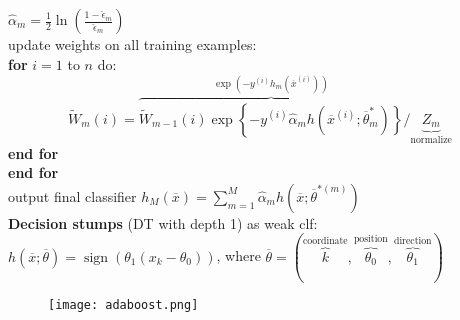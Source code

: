 \documentclass[10pt, letterpaper]{article}
\begin{document}
\begin{multicols*}{2}
\hspace*{4ex}$\boxed{\hat{\alpha}_{m}=\frac{1}{2} \ln \left(\frac{1-\hat{\epsilon}_{m}}{\hat{\epsilon}_{m}}\right)}$\\
\hspace*{2ex}update weights on all training examples:\\
\hspace*{2ex}\textbf{for} $i=1$ to $n$ do:
\vspace*{-2ex}
\[\boxed{\widetilde{W}_{m}(i)=\overbrace{\widetilde{W}_{m-1}(i) \exp \left\{-y^{(i)} \hat{\alpha}_{m} h\left(\overline{x}^{(i)} ; \overline{\theta}_{m}^{*}\right)\right\}}^{\exp\left(-y^{(i)}h_m(\overline{x}^{(i)})\right)}/\underbrace{Z_m}_{\text{normalize}}}\]
\hspace*{2ex}\textbf{end for}\\
\textbf{end for}\\
output final classifier $h_M(\overline{x})=\sum_{m=1}^{M} \hat{\alpha}_{m} h\left(\overline{x} ; \overline{\theta}^{*(m)}\right)$\\
\textbf{Decision stumps} (DT with depth 1) as weak clf:\\
$h(\overline{x} ; \overline{\theta})=\operatorname{sign}\left(\theta_{1}\left(x_{k}-\theta_{0}\right)\right)$, where $\overline{\theta}=(\overbrace{k}^{\text{coordinate}}, \overbrace{\theta_{0}}^{\text{position}}, \overbrace{\theta_{1}}^{\text{direction}})$
\vspace{-2ex}
\begin{figure}[H]
    \centering
    \texttt{[image: adaboost.png]}
\end{figure}











\end{multicols*}
\end{document}
